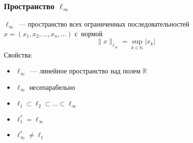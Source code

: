 
\begin{frame}\frametitle{Пространство $\ell_\infty$}
	$\ell_\infty$~--- пространство всех ограниченных последовательностей
	$x=(x_1, x_2, ..., x_n, ...)$
	с~нормой
	$$
		\|x\|_{\ell_\infty} = \sup_{k\in\mathbb{N}} |x_k|
	$$
	{Свойства:}

	\begin{itemize}
		\item
			$\ell_\infty$~--- линейное пространство над полем $\mathbb{R}$
		\item
			$\ell_\infty$  несепарабельно
		\item
			$\ell_1 \subset \ell_2 \subset \dots \subset \ell_\infty$
		\item
			$\ell_1^* = \ell_\infty$
		\item
			$\ell_\infty^* \neq \ell_1$
	\end{itemize}

\end{frame}



